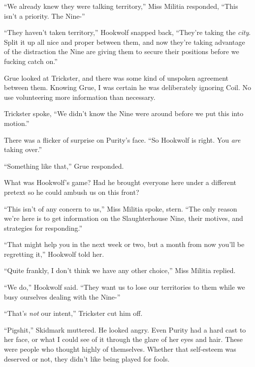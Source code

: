``We already knew they were talking territory,'' Miss Militia responded, ``This isn't a priority.  The Nine-''



``They haven't taken territory,'' Hookwolf snapped back, ``They're taking the \emph{city}.  Split it up all nice and proper between them, and now they're taking advantage of the distraction the Nine are giving them to secure their positions before we fucking catch on.''



Grue looked at Trickster, and there was some kind of unspoken agreement between them.  Knowing Grue, I was certain he was deliberately ignoring Coil.  No use volunteering more information than necessary.



Trickster spoke, ``We didn't know the Nine were around before we put this into motion.''



There was a flicker of surprise on Purity's face.  ``So Hookwolf is right.  You \emph{are} taking over.''



``Something like that,'' Grue responded.



What was Hookwolf's game?  Had he brought everyone here under a different pretext so he could ambush us on this front?



``This isn't of any concern to us,'' Miss Militia spoke, stern.  ``The only reason we're here is to get information on the Slaughterhouse Nine, their motives, and strategies for responding.''



``That might help you in the next week or two, but a month from now you'll be regretting it,'' Hookwolf told her.



``Quite frankly, I don't think we have any other choice,'' Miss Militia replied.



``We do,'' Hookwolf said.  ``They want us to lose our territories to them while we busy ourselves dealing with the Nine-''



``That's \emph{not} our intent,'' Trickster cut him off.



``Pigshit,'' Skidmark muttered.  He looked angry.  Even Purity had a hard cast to her face, or what I could see of it through the glare of her eyes and hair.  These were people who thought highly of themselves.  Whether that self-esteem was deserved or not, they didn't like being played for fools.



